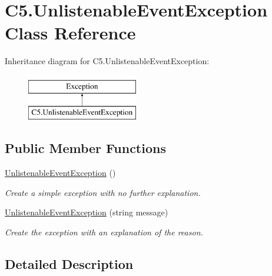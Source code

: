 \hypertarget{class_c5_1_1_unlistenable_event_exception}{}\section{C5.\+Unlistenable\+Event\+Exception Class Reference}
\label{class_c5_1_1_unlistenable_event_exception}


 


Inheritance diagram for C5.\+Unlistenable\+Event\+Exception\+:\begin{figure}[H]
\begin{center}
\leavevmode
\includegraphics[height=2.000000cm]{class_c5_1_1_unlistenable_event_exception}
\end{center}
\end{figure}
\subsection*{Public Member Functions}
\begin{DoxyCompactItemize}
\item 
\hyperlink{class_c5_1_1_unlistenable_event_exception_ad64fdca7dac55d8c1da39fcf69bb8fe7}{Unlistenable\+Event\+Exception} ()
\begin{DoxyCompactList}\small\item\em Create a simple exception with no further explanation. \end{DoxyCompactList}\item 
\hyperlink{class_c5_1_1_unlistenable_event_exception_af1c268a393c63b896e5b3a488f699b05}{Unlistenable\+Event\+Exception} (string message)
\begin{DoxyCompactList}\small\item\em Create the exception with an explanation of the reason. \end{DoxyCompactList}\end{DoxyCompactItemize}


\subsection{Detailed Description}





